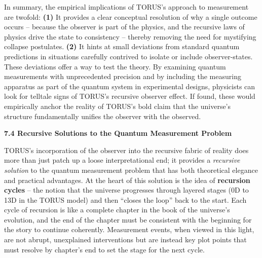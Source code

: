 \documentclass[
]{article}
\begin{document}
In summary, the empirical implications of TORUS's approach to
measurement are twofold: \textbf{(1)} It provides a clear conceptual
resolution of why a single outcome occurs -- because the observer is
part of the physics, and the recursive laws of physics drive the state
to consistency -- thereby removing the need for mystifying collapse
postulates. \textbf{(2)} It hints at small deviations from standard
quantum predictions in situations carefully contrived to isolate or
include observer-states. These deviations offer a way to test the
theory. By examining quantum measurements with unprecedented precision
and by including the measuring apparatus as part of the quantum system
in experimental designs, physicists can look for telltale signs of
TORUS's recursive observer effect. If found, these would empirically
anchor the reality of TORUS's bold claim that the universe's structure
fundamentally unifies the observer with the observed.

\textbf{7.4 Recursive Solutions to the Quantum Measurement Problem}

TORUS's incorporation of the observer into the recursive fabric of
reality does more than just patch up a loose interpretational end; it
provides a \emph{recursive solution} to the quantum measurement problem
that has both theoretical elegance and practical advantages. At the
heart of this solution is the idea of \textbf{recursion cycles} -- the
notion that the universe progresses through layered stages (0D to 13D in
the TORUS model) and then ``closes the loop'' back to the start. Each
cycle of recursion is like a complete chapter in the book of the
universe's evolution, and the end of the chapter must be consistent with
the beginning for the story to continue coherently. Measurement events,
when viewed in this light, are not abrupt, unexplained interventions but
are instead key plot points that must resolve by chapter's end to set
the stage for the next cycle.
\end{document}
